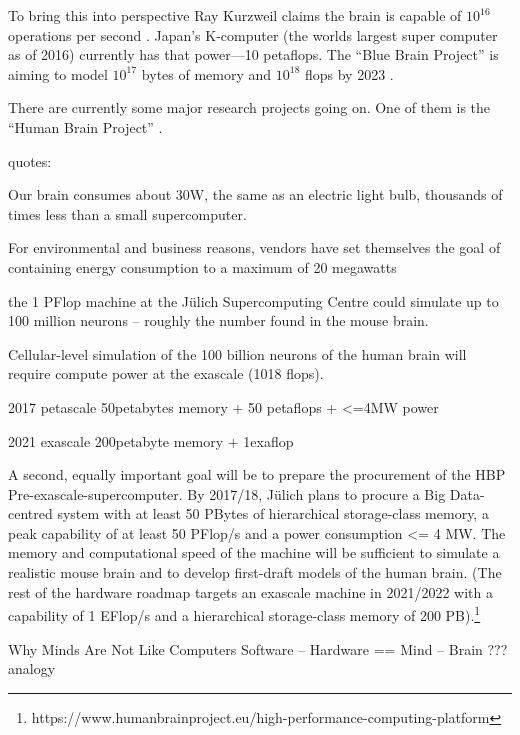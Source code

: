 To bring this into perspective Ray Kurzweil claims the brain is capable of $10^{16}$ operations per second \citeyear[p.194]{Kurzweil2013}. Japan's K-computer (the worlds largest super computer as of 2016) currently has that power---10 petaflops. The ``Blue Brain Project'' is aiming to model $10^17$ bytes of memory and $10^{18}$ flops by 2023 \autocite[p.125]{Kurzweil2013}.

There are currently some major research projects going on. One of them is the ``Human Brain Project'' \autocite{Walker2012}.

\begin{draft}
quotes:

Our brain consumes about 30W, the same as an electric light bulb, thousands of times less than a small supercomputer. \autocite[p.17]{Walker2012}

For environmental and business reasons, vendors have set themselves the goal of containing energy consumption to a maximum of 20 megawatts  \autocite[p.41]{Walker2012}

the 1 PFlop machine at the Jülich Supercomputing Centre could simulate up to 100 million neurons – roughly the number found in the mouse brain. \autocite[p.41]{Walker2012}

Cellular-level simulation of the 100 billion neurons of the human brain will require compute power at the exascale (1018 flops). \autocite[p.41-42]{Walker2012}

2017 petascale 50petabytes memory + 50 petaflops + <=4MW power

2021 exascale 200petabyte memory + 1exaflop

A second, equally important goal will be to prepare the procurement of the HBP Pre-exascale-supercomputer. By 2017/18, Jülich plans to procure a Big Data-centred system with at least 50 PBytes of hierarchical storage-class memory, a peak capability of at least 50 PFlop/s and a power consumption <= 4 MW. The memory and computational speed of the machine will be sufficient to simulate a realistic mouse brain and to develop first-draft models of the human brain. (The rest of the hardware roadmap targets an exascale machine in 2021/2022 with a capability of 1 EFlop/s and a hierarchical storage-class memory of 200 PB).\footnote{https://www.humanbrainproject.eu/high-performance-computing-platform}

\end{draft}

Why Minds Are Not Like Computers \autocite{Schulman2009}
Software – Hardware == Mind – Brain ??? analogy

